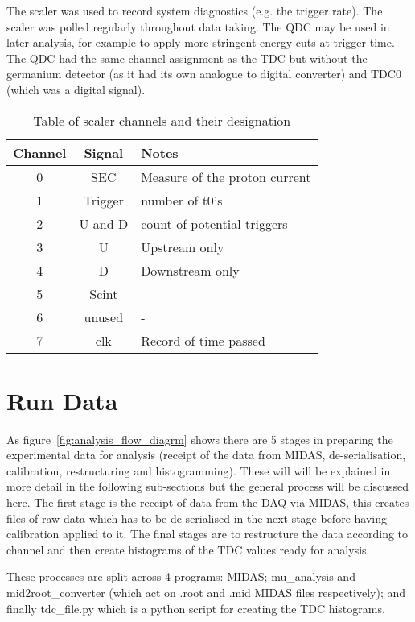 \documentclass[]{article}
\begin{document}
The scaler was used to record system diagnostics (e.g. the trigger rate). The scaler was polled regularly throughout data taking. The QDC may be used in later analysis, for example to apply more stringent energy cuts at trigger time. The QDC had the same channel assignment as the TDC but without the germanium detector (as it had its own analogue to digital converter) and TDC0 (which was a digital signal).
\begin{table}
	\centering
	\begin{tabular}{c|c|l}
		Channel & Signal & Notes\\
		\hline
		0 & SEC & Measure of the proton current\\
		1 & Trigger & number of t0's\\
		2 & U and $\overline{\text{D}}$ & count of potential triggers\\
		3 & U & Upstream only\\
		4 & D & Downstream only\\
		5 & Scint & -\\
		6 & unused & -\\
		7 & clk & Record of time passed\\
	\end{tabular}
	\caption{Table of scaler channels and their designation}
	\label{tab:scaler_chs}
\end{table}

\section{Run Data} %
\label{sec:run_data}
As figure~\ref{fig:analysis_flow_diagrm} shows there are 5 stages in preparing the experimental data for analysis (receipt of the data from MIDAS, de-serialisation, calibration, restructuring and histogramming). These will will be explained in more detail in the following sub-sections but the general process will be discussed here. The first stage is the receipt of data from the DAQ via MIDAS, this creates files of raw data which has to be de-serialised in the next stage before having calibration applied to it. The final stages are to restructure the data according to channel and then create histograms of the TDC values ready for analysis. 

These processes are split across 4 programs: MIDAS; mu\_analysis and mid2root\_converter (which act on .root and .mid MIDAS files respectively); and finally tdc\_file.py which is a python script for creating the TDC histograms.
\end{document}
